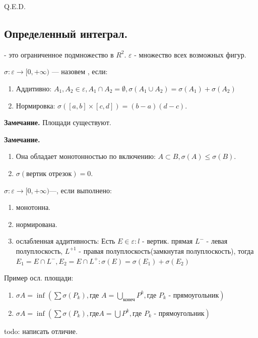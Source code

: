 \hfill Q.E.D.

\subsection{Определенный интеграл.}


  - это ограниченное подмножество в $R^2$. $\varepsilon$ - множество всех возможных фигур.

$\sigma: \varepsilon \rightarrow [0,+\infty)$ ---  назовем , если:
\begin{enumerate}
    \item Аддитивно: $A_1,A_2 \in \varepsilon, A_1\cap A_2 = \emptyset, \sigma(A_1\cup A_2) = \sigma(A_1)+\sigma(A_2)$
\item Нормировка: $\sigma ([a,b]\times[c,d]) = (b-a)(d-c)$.
\end{enumerate}

\textbf{Замечание.} Площади существуют.

\textbf{Замечание.} \begin{enumerate}
    \item Она обладает монотонностью по включению: $A \subset B, \sigma(A) \leq \sigma(B)$.
    \item $\sigma(\text{вертик отрезок})=0$.
\end{enumerate}

  $\sigma:\varepsilon\rightarrow [0,+\infty)$---, если выполнено:
\begin{enumerate}
    \item монотонна.
    \item нормирована.
    \item ослабленная аддитивность: Есть $E \in \varepsilon: l $ - вертик. прямая $L^-$ - левая полуплоскость, $L^{+1}$ - правая полуплоскость(замкнутая полуплоскость), тогда  $E_1 = E\cap L^-, E_2 = E \cap L^+: \sigma(E)=\sigma(E_1)+\sigma(E_2)$
\end{enumerate}

Пример осл. площади:
\begin{enumerate}
    \item $\sigma A = \inf (\sum \sigma(P_k), \text{где $A = \bigcup\limits_{\text{конеч}}P^k, \text{где $P_k$ - прямоугольник}$})$ 
    \item $\sigma A = \inf (\sum \sigma(P_k), \text{где} A = \bigcup P^k, \text{где $P_k$ - прямоугольник})$
\end{enumerate}

todo: написать отличие.

